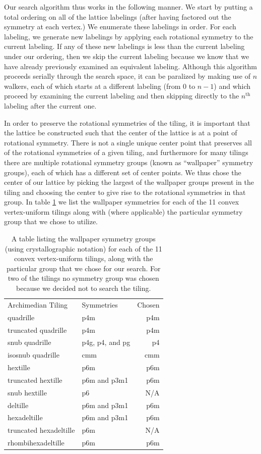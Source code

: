 \documentclass[twocolumn,showpacs,preprintnumbers,amsmath,amssymb,nofootinbib,pra,floatfix]{revtex4-1}
\begin{document}
Our search algorithm thus works in the following manner.  We start by putting a total ordering on all of the lattice labelings (after having factored out the symmetry at each vertex.)  We enumerate these labelings in order.  For each labeling, we generate new labelings by applying each rotational symmetry to the current labeling.  If any of these new labelings is less than the current labeling under our ordering, then we skip the current labeling because we know that we have already previously examined an equivalent labeling.  Although this algorithm proceeds serially through the search space, it can be paralized by making use of $n$ walkers, each of which starts at a different labeling (from $0$ to $n-1$) and which proceed by examining the current labeling and then skipping directly to the $n^{\text{th}}$ labeling after the current one.

In order to preserve the rotational symmetries of the tiling, it is important that the lattice be constructed such that the center of the lattice is at a point of rotational symmetry.  There is not a single unique center point that preserves all of the rotational symmetries of a given tiling, and furthermore for many tilings there are multiple rotational symmetry groups (known as ``wallpaper'' symmetry groups), each of which has a different set of center points.  We thus chose the center of our lattice by picking the largest of the wallpaper groups present in the tiling and choosing the center to give rise to the rotational symmetries in that group.  In table \ref{table:symmetries} we list the wallpaper symmetries for each of the 11 convex vertex-uniform tilings along with (where applicable) the particular symmetry group that we chose to utilize.

\begin{table}
\begin{tabular}{llr}
\toprule
Archimedian Tiling & Symmetries & Chosen\\
quadrille & p4m & p4m \\
truncated quadrille & p4m & p4m \\
snub quadrille & p4g, p4, and pg & p4 \\
isosnub quadrille & cmm & cmm \\
hextille & p6m & p6m \\
truncated hextille & p6m and p3m1 & p6m \\
snub hextille & p6 & N/A \\
deltille & p6m and p3m1 & p6m \\
hexadeltille & p6m and p3m1 & p6m \\
truncated hexadeltille & p6m & N/A \\
rhombihexadeltille & p6m & p6m \\
\bottomrule
\end{tabular}
\caption{
\label{table:symmetries}
A table listing the wallpaper symmetry groups (using crystallographic notation) for each of the 11 convex vertex-uniform tilings, along with the particular group that we chose for our search.  For two of the tilings no symmetry group was chosen because we decided not to search the tiling.
}
\end{table}
\end{document}
